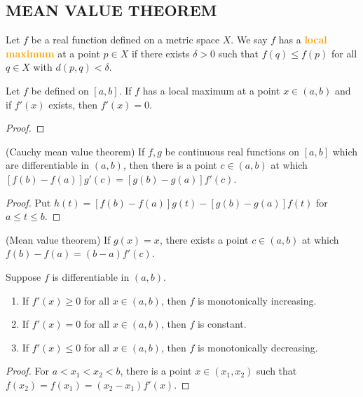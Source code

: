 \subsection{MEAN VALUE THEOREM}
\begin{definition}
Let $f$ be a real function defined on a metric space $X$. We say $f$ has a \textbf{\textcolor{orange}{local maximum}} at a point $p\in X$ if there exists $\delta>0$ such that $f(q)\leq f(p)$ for all $q\in X$ with $d(p,q)<\delta$.
\end{definition}

\begin{theorem}
Let $f$ be defined on $[a,b]$. If $f$ has a local maximum at a point $x\in(a,b)$ and if $f'(x)$ exists, then $f'(x)=0$.
\end{theorem}
\begin{proof}

\end{proof}

\begin{theorem}
(Cauchy mean value theorem) If $f,g$ be continuous real functions on $[a,b]$ which are differentiable in $(a,b)$, then there is a point $c\in (a,b)$ at which $[f(b)-f(a)]g'(c)=[g(b)-g(a)]f'(c)$.
\end{theorem}
\begin{proof}
Put $h(t)=[f(b)-f(a)]g(t)-[g(b)-g(a)]f(t)$ for $a\leq t\leq b$.
\end{proof}

\begin{corollary}
(Mean value theorem) If $g(x)=x$, there exists a point $c\in (a,b)$ at which $f(b)-f(a)=(b-a)f'(c)$.
\end{corollary}

\begin{theorem}
Suppose $f$ is differentiable in $(a,b)$.
\begin{enumerate}[label={(\alph*)}]
\item If $f'(x)\geq 0$ for all $x\in(a,b)$, then $f$ is monotonically increasing.
\item If $f'(x)=0$ for all $x\in (a,b)$, then $f$ is constant.
\item If $f'(x)\leq 0$ for all $x\in (a,b)$, then $f$ is monotonically decreasing.
\end{enumerate}
\end{theorem}
\begin{proof}
For $a< x_1< x_2< b$, there is a point $x\in (x_1,x_2)$ such that $f(x_2)=f(x_1)=(x_2-x_1)f'(x)$.
\end{proof}

